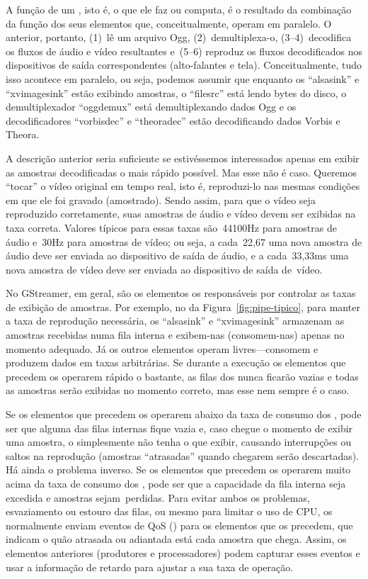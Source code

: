 \documentclass{SBCbookchapter}
\begin{document}
A função de um , isto é, o que ele faz ou computa, é o
resultado da combinação da função dos seus elementos que, conceitualmente,
operam em paralelo.  O  anterior, portanto, (1)~lê um arquivo
Ogg, (2)~demultiplexa-o, (3--4)~decodifica os fluxos de áudio e vídeo
resultantes e~(5--6) reproduz os fluxos decodificados nos dispositivos de
saída correspondentes (alto-falantes e tela).  Conceitualmente, tudo isso
acontece em paralelo, ou seja, podemos assumir que enquanto os 
``alsasink'' e ``xvimagesink'' estão exibindo amostras, o 
``filesrc'' está lendo bytes do disco, o demultiplexador ``oggdemux'' está
demultiplexando dados Ogg e os decodificadores ``vorbisdec'' e ``theoradec''
estão decodificando dados Vorbis e Theora.

A descrição anterior seria suficiente se estivéssemos interessados apenas em
exibir as amostras decodificadas o mais rápido possível.  Mas esse não é
caso.  Queremos ``tocar'' o vídeo original em tempo real, isto é,
reproduzi-lo nas mesmas condições em que ele foi gravado (amostrado).  Sendo
assim, para que o vídeo seja reproduzido corretamente, suas amostras de áudio
e vídeo devem ser exibidas na taxa correta.  Valores típicos para essas
taxas são~44100Hz para amostras de áudio e~30Hz para amostras de vídeo; ou
seja, a cada~22{,}67 uma nova amostra de áudio deve ser enviada ao
dispositivo de saída de áudio, e a cada~33{,}33ms uma nova amostra de vídeo
deve ser enviada ao dispositivo de saída de~vídeo.

No GStreamer, em geral, são os elementos  os responsáveis por
controlar as taxas de exibição de amostras.  Por exemplo, no  da
Figura~\ref{fig:pipe-tipico}, para manter a taxa de reprodução necessária, os
 ``alsasink'' e ``xvimagesink'' armazenam as amostras recebidas numa
fila interna e exibem-nas (consomem-nas) apenas no momento adequado.  Já os
outros elementos operam livres---consomem e produzem dados em taxas
arbitrárias.  Se durante a execução os elementos que precedem os 
operarem rápido o bastante, as filas dos  nunca ficarão vazias e
todas as amostras serão exibidas no momento correto, mas esse nem sempre é o
caso.

Se os elementos que precedem os  operarem abaixo da taxa de consumo
dos , pode ser que alguma das filas internas fique vazia e,
caso chegue o momento de exibir uma amostra, o  simplesmente não tenha
o que exibir, causando interrupções ou saltos na reprodução (amostras
``atrasadas'' quando chegarem serão descartadas).  Há ainda o problema inverso.
Se os elementos que precedem os  operarem muito acima da taxa de
consumo dos , pode ser que a capacidade da fila interna seja excedida
e amostras sejam~perdidas.  Para evitar ambos os problemas, esvaziamento ou
estouro das filas, ou mesmo para limitar o uso de CPU, os 
normalmente enviam eventos de QoS () para os elementos
que os precedem, que indicam o quão atrasada ou adiantada está cada amostra que
chega.  Assim, os elementos anteriores (produtores e processadores) podem
capturar esses eventos e usar a informação de retardo para ajustar a sua taxa
de operação.
\end{document}
